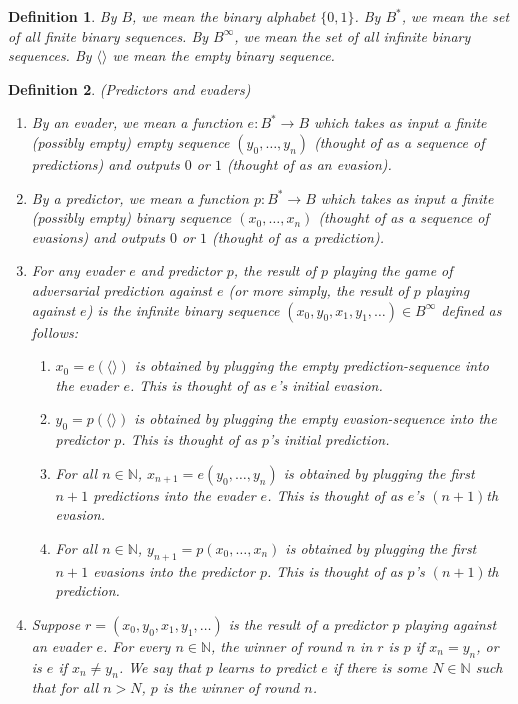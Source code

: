 \documentclass{article}
\newtheorem{definition}{Definition}
\begin{document}
\begin{definition}
By $B$, we mean the binary alphabet $\{0,1\}$. By $B^*$, we mean the set of all
finite binary sequences. By $B^\infty$, we mean the set of all infinite binary
sequences. By $\langle\rangle$ we mean the empty binary sequence.
\end{definition}

\begin{definition}
    (Predictors and evaders)
    \begin{enumerate}
        \item
        By an \emph{evader}, we mean a function $e:B^*\to B$
        which takes as input a finite (possibly empty) empty sequence $(y_0,\ldots,y_n)$
        (thought of as a sequence of \emph{predictions})
        and outputs $0$ or $1$ (thought of as an \emph{evasion}).
        \item
        By a \emph{predictor}, we mean a function $p:B^*\to B$
        which takes as input a finite (possibly empty) binary sequence $(x_0,\ldots,x_n)$
        (thought of as a sequence of \emph{evasions})
        and outputs $0$ or $1$ (thought of as a \emph{prediction}).
        \item
        For any evader $e$ and predictor $p$, the \emph{result of $p$ playing the
        game of adversarial prediction against $e$} (or more simply, the \emph{result of
        $p$ playing against $e$}) is the infinite binary sequence
        $(x_0,y_0,x_1,y_1,\ldots)\in B^\infty$
        defined as follows:
        \begin{enumerate}
            \item
            $x_0=e(\langle\rangle)$ is obtained by plugging the empty prediction-sequence into
            the evader $e$. This is thought of as $e$'s initial evasion.
            \item
            $y_0=p(\langle\rangle)$ is obtained by plugging the empty evasion-sequence into
            the predictor $p$. This is thought of as $p$'s initial prediction.
            \item
            For all $n\in\mathbb N$,
            $x_{n+1}=e(y_0,\ldots,y_n)$ is obtained by plugging the first $n+1$ predictions
            into the evader $e$. This is thought of as $e$'s $(n+1)$th evasion.
            \item
            For all $n\in\mathbb N$,
            $y_{n+1}=p(x_0,\ldots,x_n)$ is obtained by plugging the first $n+1$ evasions into
            the predictor $p$. This is thought of as $p$'s $(n+1)$th prediction.
        \end{enumerate}
        \item
        Suppose $r=(x_0,y_0,x_1,y_1,\ldots)$ is the result of a predictor $p$ playing
        against an evader $e$. For every $n\in\mathbb N$, the \emph{winner of round $n$}
        in $r$ is $p$ if $x_n=y_n$, or is $e$ if $x_n\neq y_n$.
        We say that \emph{$p$ learns to predict $e$} if there is some $N\in\mathbb N$
        such that for all $n>N$, $p$ is the winner of round $n$.
    \end{enumerate}
\end{definition}



\end{document}
